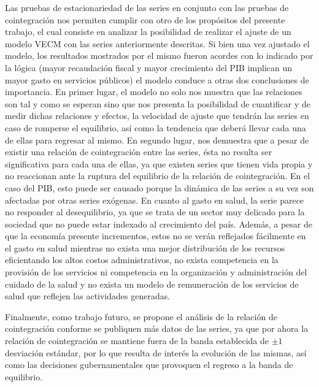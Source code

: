 Las pruebas de estacionariedad de las series en conjunto con las pruebas de cointegración nos permiten cumplir con otro de los propósitos del presente trabajo, el cual consiste en analizar la posibilidad de realizar el ajuste de un modelo VECM con las series anteriormente descritas. Si bien una vez ajustado el modelo, los resultados mostrados por el mismo fueron acordes con lo indicado por la lógica (mayor recaudación fiscal y mayor crecimiento del PIB implican un mayor gasto en servicios públicos) el modelo conduce a otras dos conclusiones de importancia. En primer lugar, el modelo no solo nos muestra que las relaciones son tal y como se esperan sino que nos presenta la posibilidad de cuantificar y de medir dichas relaciones y efectos, la velocidad de ajuste que tendrán las series en caso de romperse el equilibrio, así como la tendencia que deberá llevar cada una de ellas para regresar al mismo. En segundo lugar, nos demuestra que a pesar de existir una relación de cointegración entre las series, ésta no resulta ser significativa para cada una de ellas, ya que existen series que tienen vida propia y no reaccionan ante la ruptura del equilibrio de la relación de cointegración. En el caso del PIB, esto puede ser causado porque la dinámica de las series a su vez son afectadas por otras series exógenas. En cuanto al gasto en salud, la serie parece no responder al desequilibrio, ya que se trata de un sector muy delicado para la sociedad que no puede estar indexado al crecimiento del país. Además,  a pesar de que la economía presente incrementos, estos no se verán reflejados fácilmente en el gasto en salud mientras no exista una mejor distribución de los recursos eficientando los altos costos administrativos, no exista competencia en la provisión de los servicios ni competencia en la organización y administración del cuidado de la salud y no exista un modelo de remuneración de los servicios de salud que reflejen las actividades generadas.\bigskip


Finalmente, como trabajo futuro, se propone el análisis de la relación de cointegración conforme se publiquen más datos de las series, ya que por ahora la relación de cointegración se mantiene fuera de la banda establecida de $\pm 1$ desviación estándar, por lo que resulta de interés la evolución de las mismas, así como las decisiones gubernamentales que provoquen el regreso a la banda de equilibrio.\bigskip
